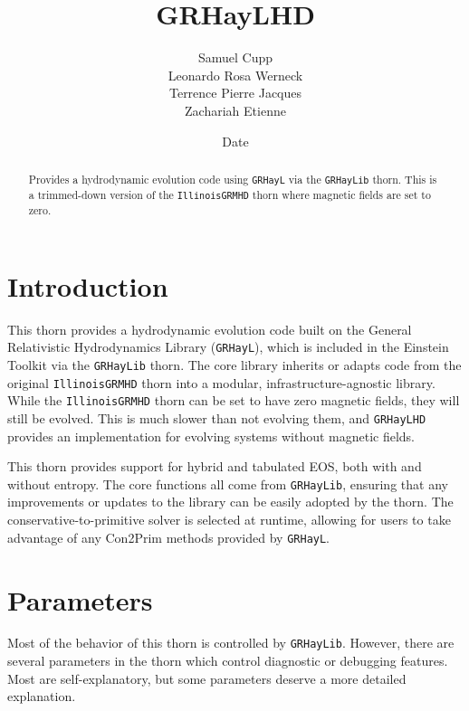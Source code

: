 \documentclass{article}
\newcommand{\grhayl}{\texttt{GRHayL}\xspace}
\newcommand{\glib}{\texttt{GRHayLib}\xspace}
\newcommand{\ghd}{\texttt{GRHayLHD}\xspace}
\newcommand{\igm}{\texttt{IllinoisGRMHD}\xspace}
\begin{document}
\title{GRHayLHD}
\author{Samuel Cupp \\ Leonardo Rosa Werneck \\ Terrence Pierre Jacques \\ Zachariah Etienne}
\date{$ $Date$ $}

\maketitle


\begin{abstract}
Provides a hydrodynamic evolution code using \grhayl via the
\glib thorn. This is a trimmed-down version of the \igm thorn
where magnetic fields are set to zero.
\end{abstract}

\section{Introduction}

This thorn provides a hydrodynamic evolution code built on
the General Relativistic Hydrodynamics Library (\grhayl),
which is included in the Einstein Toolkit via the \glib
thorn. The core library inherits or adapts code from the
original \igm thorn into a modular, infrastructure-agnostic
library. While the \igm thorn can be set to have
zero magnetic fields, they will still be evolved. This
is much slower than not evolving them, and \ghd provides an
implementation for evolving systems without magnetic
fields.

This thorn provides support for hybrid and tabulated EOS, both
with and without entropy. The core functions all come from \glib,
ensuring that any improvements or updates to the library can
be easily adopted by the thorn. The conservative-to-primitive
solver is selected at runtime, allowing for users to take
advantage of any Con2Prim methods provided by \grhayl.

\section{Parameters}

Most of the behavior of this thorn is controlled by \glib. However,
there are several parameters in the thorn which control diagnostic
or debugging features. Most are self-explanatory, but some parameters
deserve a more detailed explanation.
\end{document}

